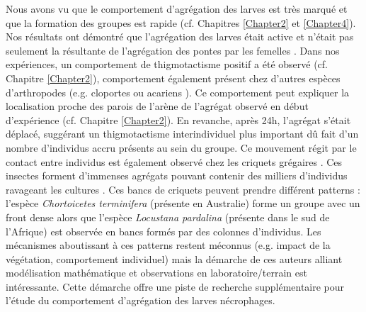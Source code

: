 Nous avons vu que le comportement d'agrégation des larves est très marqué et que la formation des groupes est rapide (cf. Chapitres \ref{Chapter2} et \ref{Chapter4}). Nos résultats ont démontré que l'agrégation des larves était active et n'était pas seulement la résultante de l'agrégation des pontes par les femelles \cite{fenton_oviposition_1999}. Dans nos expériences, un comportement de thigmotactisme positif a été observé (cf. Chapitre \ref{Chapter2}), comportement également présent chez d'autres espèces d'arthropodes (e.g. cloportes \cite{devigne_individual_2011} ou acariens \cite{mailleux_collective_2011}). Ce comportement peut expliquer la localisation proche des parois de l'arène de l'agrégat observé en début d'expérience (cf. Chapitre \ref{Chapter2}). En revanche, après 24h, l'agrégat s'était déplacé, suggérant un thigmotactisme interindividuel plus important dû fait d'un nombre d'individus accru présents au sein du groupe. Ce mouvement régit par le contact entre individus est également observé chez les criquets grégaires \cite{simpson_gregarious_2001}. Ces insectes forment d'immenses agrégats pouvant contenir des milliers d'individus ravageant les cultures \citep{buhl_using_2012,buhl_group_2010}. Ces bancs de criquets peuvent prendre différent patterns : l'espèce \textit{Chortoicetes terminifera} (présente en Australie) forme un groupe avec un front dense alors que l'espèce \textit{Locustana pardalina} (présente dans le sud de l'Afrique) est observée en bancs formés par des colonnes d'individus. Les mécanismes aboutissant à ces patterns restent méconnus (e.g. impact de la végétation, comportement individuel) mais la démarche de ces auteurs alliant modélisation mathématique et observations en laboratoire/terrain est intéressante. Cette démarche offre une piste de recherche supplémentaire pour l'étude du comportement d'agrégation des larves nécrophages.

